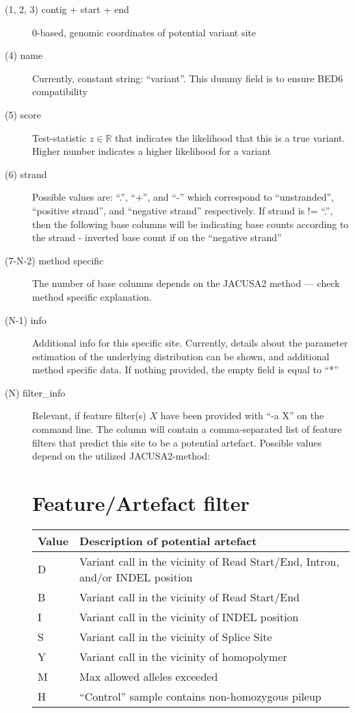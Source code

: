 \documentclass[10pt,a4paper,draft]{article}
\begin{document}
\begin{description}
\item[(1, 2, 3) contig + start + end] 0-based, genomic coordinates of potential variant site
\item[(4) name] Currently, constant string: ``variant''. This dummy field is to ensure BED6
compatibility
\item[(5) score] Test-statistic $z \in \mathbb{R}$ that indicates the likelihood that this is a true
variant. Higher number indicates a higher likelihood for a variant
\item[(6) strand] Possible values are: ``.'', ``+'', and ``-'' which correspond to ``unstranded'',
``positive strand'', and ``negative strand'' respectively. If strand is != ``.'', then the following base columns
will be indicating base counts according to the strand - inverted base count if on the ``negative
strand''
\item[(7-N-2) method specific] The number of base columns depends on the JACUSA2 method --- check method specific explanation.
\item[(N-1) info] Additional info for this specific site. Currently, details about the parameter
estimation of the underlying distribution can be shown, and additional method specific data. 
If nothing provided, the empty field is equal to ``*''
\item[(N) filter\_info] Relevant, if feature filter(s) $X$ have been provided with ``-a X'' on the
command line. The column will contain a comma-separated list of feature filters that predict this
site to be a potential artefact. Possible values depend on the utilized JACUSA2-method: \\ 

\section{Feature/Artefact filter}
\begin{tabular}{lp{}}
\textbf{Value} & \textbf{Description of potential artefact} \\
\hline
D & Variant call in the vicinity of Read Start/End, Intron, and/or INDEL position \\
B & Variant call in the vicinity of Read Start/End \\
I & Variant call in the vicinity of INDEL position \\
S & Variant call in the vicinity of Splice Site \\
Y & Variant call in the vicinity of homopolymer \\
M & Max allowed alleles exceeded \\ 
H & ``Control'' sample contains non-homozygous pileup \\
\end{tabular}
\end{description}
\end{document}

